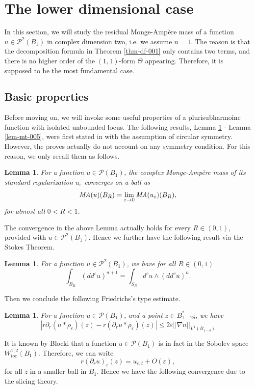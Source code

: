 \documentclass[a4paper,11pt]{amsart}
\numberwithin{equation}{section}
\newtheorem{lemma}[theorem]{Lemma}
\def\d{\partial}
\def\cP{{\mathcal P}}
\def\cP{{\mathcal P}}
\let\ep=\varepsilon
\begin{document}
\bigskip 


\section{The lower dimensional case}
\smallskip

In this section,
we will study the residual Monge-Amp\`ere mass 
of a function $u\in \cP^{2}(B_1)$ in complex dimension two, 
i.e. we assume $n=1$. 
The reason is that 
the decomposition formula in Theorem \ref{thm-df-001}
only contains two terms, and 
there is no higher order of the $(1,1)$-form $\Theta$
appearing. 
Therefore, it is supposed to be the most fundamental case.




\subsection{Basic properties}
Before moving on, 
we will invoke some useful properties 
of a plurisubharmoinc function with isolated unbounded locus. 
The following results, Lemma \ref{lem-mt-001} - Lemma \ref{lem-mt-005}, 
were first stated in \cite{Li23} with the assumption of circular symmetry. 
However, the proves actually do not account on any symmetry condition.  
For this reason, we only recall them as follows. 

\begin{lemma}
\label{lem-mt-001}
For a function $u\in \cP(B_1)$, the complex Monge-Amp\`ere 
mass of its standard regularization $u_{\ep}$ converges on a ball as 
$$ \emph{MA}(u)(B_R) = \lim_{\ep\rightarrow 0} \emph{MA}(u_{\ep}) (B_R), $$
for almost all $0< R <1$. 
\end{lemma}

The convergence in the above Lemma actually holds for every $R\in (0,1)$, 
provided with $u\in \cP^{2}(B_1)$. Hence we further have the following result via the Stokes Theorem. 


\begin{lemma}
\label{lem-mt-002}
For a function $u\in \cP^{2}(B_1)$, we have for all $R\in (0,1)$ 
$$ \int_{B_R} (dd^c u)^{n+1} = \int_{S_R} d^c u \wedge (dd^c u)^n. $$
\end{lemma}


Then we  conclude the following Friedrichs's type estimate. 

\begin{lemma}
\label{lem-mt-003}
For a function $u\in \cP(B_1)$, and a point $z\in B^*_{1-2\delta}$, we have 
$$ | r\d_r (u * \rho_{\ep})(z) - r (\d_r u* \rho_{\ep})(z) | \leq 2\ep || \nabla u ||_{L^1(B_{1-\delta})} $$
\end{lemma}
It is known by Blocki \cite{Blo04} 
that a function $u\in \cP(B_1)$ is in fact in the Sobolev space $W^{1,2}_{loc}(B_1)$. 
Therefore, we can write 
\begin{equation}
\label{mt-001}
r (\d_r u)_{\ep}(z) = u_{\ep, t} + O(\ep),
\end{equation}
for all $z$ in a smaller ball in $B_1$. 
Hence we have the following convergence due to the slicing theory. 
\end{document}
